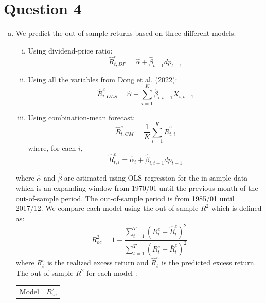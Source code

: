 
\section*{Question 4}
\begin{enumerate}[(a)]
    \item We predict the out-of-sample returns based on three different models:
    \begin{enumerate}[i.]
        \item Using dividend-price ratio:
            \begin{equation*}
                    \hat{R}_{t,DP}^e = \hat{\alpha} + \hat{\beta}_{t-1} dp_{t-1}  
            \end{equation*}
        \item Using all the variables from Dong et al. (2022):
            \begin{equation*}
                \hat{R}_{t,OLS}^e = \hat{\alpha} + \sum_{i=1}^{K}\hat{\beta}_{i,t-1} X_{i,t-1}
            \end{equation*}
        \item Using combination-mean forecast:
            \begin{equation*}
                \hat{R}_{t,CM}^e = \frac{1}{K}\sum_{i=1}^{K} \hat{R}_{t,i}^e
            \end{equation*}
            where, for each $i$,
            \begin{equation*}
                \hat{R}_{t,i}^e = \hat{\alpha}_i + \hat{\beta}_{i,t-1} dp_{t-1}
            \end{equation*}
    \end{enumerate}
    where $\hat{\alpha}$ and $\hat{\beta}$ are estimated using OLS regression for the in-sample data which is an expanding window from 1970/01 until the previous month of the out-of-sample period. The out-of-sample period is from 1985/01 until 2017/12. We compare each model using the out-of-sample $R^2$ which is defined as:
    \begin{equation*}
        R^2_{oc} = 1 - \frac{\sum_{t=1}^{T} (R_{t}^e - \hat{R}_{t}^e)^2}{\sum_{t=1}^{T} (R_{t}^e - \bar{R}_{t}^e)^2}
    \end{equation*}
    where $R_{t}^e$ is the realized excess return and $\hat{R}_{t}^e$ is the predicted excess return. The out-of-sample $R^2$ for each model :
    \begin{table}[H]
        \centering
        \begin{tabular}{c|c}
            Model & $R^2_{oc}$ \\

\end{tabular}
\end{table}
\end{enumerate}
